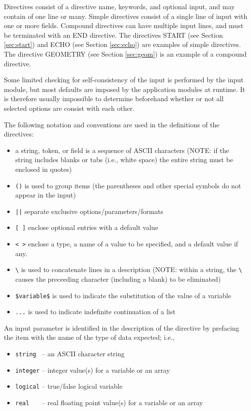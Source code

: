 Directives consist of a directive name, keywords, and optional input, and
may contain of one line or many.  Simple directives 
consist of a single
line of input with one or more fields.  Compound directives can have
multiple input lines, and must be terminated with an END directive.  The
directives START (see Section \ref{sec:start}) and ECHO (see Section \ref{sec:echo})
are examples of simple directives.  The directive GEOMETRY (see Section 
\ref{sec:geom}) is 
an example of a compound directive.


Some limited checking for self-consistency of the input is performed
by the input module, but most defaults are imposed by the
application modules at runtime.  It is therefore usually impossible
to determine beforehand whether or not all selected options are
consist with each other.

The following notation and conventions are used in the definitions of the directives:

\begin{itemize}
\item a string, token, or field is a sequence of ASCII characters (NOTE: if 
the string includes blanks or tabs (i.e., white space) the entire string must
be enclosed in quotes)
\item \verb+()+ is used to group items (the parentheses and other
      special symbols do not appear in the input)
\item \verb+||+ separate exclusive options/parameters/formats
\item \verb+[ ]+ enclose optional entries with a default value
\item \verb+< >+ enclose a type, a name of a value to be specified,
      and a default value if any.

\item \verb+\+ is used to concatenate lines in a description (NOTE: within 
a string, the \verb+\+ causes the preceeding character (including a blank) 
to be eliminated) 
\item \verb+$variable$+ is used to indicate the substitution of the value of a
      variable
\item \verb+...+ is used to indicate indefinite continuation of a list
\end{itemize}

An input parameter is identified in the description of the
directive by prefacing the item with the name of the type of data expected;
i.e., 

\begin{itemize}
\item \verb+string +  -- an ASCII character string
\item \verb+integer+ --  integer value(s) for a variable or an array
\item \verb+logical+ --  true/false logical variable
\item \verb+real   +  -- real floating point value(s) for a variable or an array
\end{itemize}

